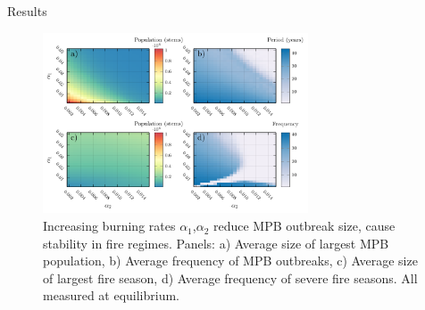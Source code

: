 \documentclass{beamer}
\begin{document}
\begin{frame}{Results}
    \begin{figure}
        \includegraphics[width=0.7\textwidth]{mpb/a1_a2_phase.pdf}
        
        \caption{ \footnotesize Increasing burning rates $\alpha_1$,$\alpha_2$ reduce MPB outbreak size, cause stability in fire regimes. Panels: a) Average size of largest MPB population, b) Average frequency of MPB outbreaks, c) Average size of largest fire season, d) Average frequency of severe fire seasons. All measured at equilibrium. }
    \end{figure}
\end{frame}
\end{document}
